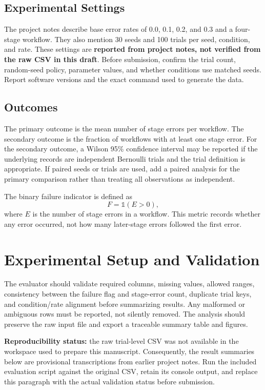 \documentclass[conference]{IEEEtran}
\begin{document}
\subsection{Experimental Settings}
The project notes describe base error rates of 0.0, 0.1, 0.2, and 0.3 and a four-stage workflow. They also mention 30 seeds and 100 trials per seed, condition, and rate. These settings are \textbf{reported from project notes, not verified from the raw CSV in this draft}. Before submission, confirm the trial count, random-seed policy, parameter values, and whether conditions use matched seeds. Report software versions and the exact command used to generate the data.

\subsection{Outcomes}
The primary outcome is the mean number of stage errors per workflow. The secondary outcome is the fraction of workflows with at least one stage error. For the secondary outcome, a Wilson 95\% confidence interval may be reported if the underlying records are independent Bernoulli trials and the trial definition is appropriate. If paired seeds or trials are used, add a paired analysis for the primary comparison rather than treating all observations as independent.

The binary failure indicator is defined as
\[
F = \mathbb{1}(E > 0),
\]
where $E$ is the number of stage errors in a workflow. This metric records whether any error occurred, not how many later-stage errors followed the first error.

\section{Experimental Setup and Validation}
The evaluator should validate required columns, missing values, allowed ranges, consistency between the failure flag and stage-error count, duplicate trial keys, and condition/rate alignment before summarizing results. Any malformed or ambiguous rows must be reported, not silently removed. The analysis should preserve the raw input file and export a traceable summary table and figures.

\textbf{Reproducibility status:} the raw trial-level CSV was not available in the workspace used to prepare this manuscript. Consequently, the result summaries below are provisional transcriptions from earlier project notes. Run the included evaluation script against the original CSV, retain its console output, and replace this paragraph with the actual validation status before submission.
\end{document}
